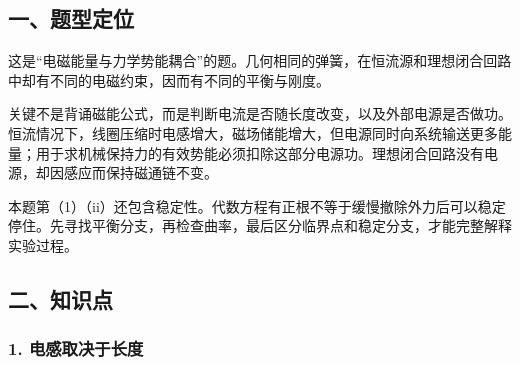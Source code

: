\documentclass[12pt,a4paper,fontset=fandol]{ctexart}
\begin{document}
\begin{center}
\begin{minipage}{\linewidth}
\centering\begingroup{}
\ifdim\wd\diagrambox>.88\linewidth
\sbox{\diagrambox}{\resizebox{.88\linewidth}{!}{\usebox{\diagrambox}}}\fi
\ifdim\ht\diagrambox>.38\textheight
\resizebox{!}{.38\textheight}{\usebox{\diagrambox}}
\else\usebox{\diagrambox}\fi
\par{}\endgroup\end{minipage}\end{center}

\subsection{一、题型定位}\label{ux4e00ux9898ux578bux5b9aux4f4d-1}

这是``电磁能量与力学势能耦合''的题。几何相同的弹簧，在恒流源和理想闭合回路中却有不同的电磁约束，因而有不同的平衡与刚度。

关键不是背诵磁能公式，而是判断电流是否随长度改变，以及外部电源是否做功。恒流情况下，线圈压缩时电感增大，磁场储能增大，但电源同时向系统输送更多能量；用于求机械保持力的有效势能必须扣除这部分电源功。理想闭合回路没有电源，却因感应而保持磁通链不变。

本题第（1）（ii）还包含稳定性。代数方程有正根不等于缓慢撤除外力后可以稳定停住。先寻找平衡分支，再检查曲率，最后区分临界点和稳定分支，才能完整解释实验过程。

\subsection{二、知识点}\label{ux4e8cux77e5ux8bc6ux70b9-1}

\subsubsection{1.
电感取决于长度}\label{ux7535ux611fux53d6ux51b3ux4e8eux957fux5ea6}
\end{document}
